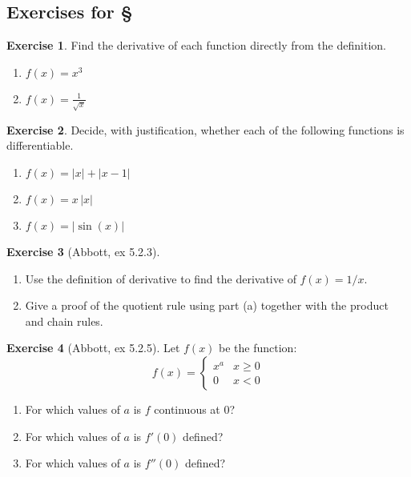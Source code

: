 \documentclass[11pt,oneside]{amsbook}
\theoremstyle{definition}
\newtheorem{exerc}{Exercise}[section]
\theoremstyle{plain}
\theoremstyle{definition}
\theoremstyle{remark}
\numberwithin{equation}{section}
\numberwithin{figure}{section}
\begin{document}

\newpage
\subsection*{Exercises for \S \thesection}

\begin{exerc}
  Find the derivative of each function directly from the definition.
  \begin{enumerate}
    \item $\displaystyle f(x)=x^3$
    \item $\displaystyle f(x)=\frac{1}{\sqrt{x}}$
  \end{enumerate}
\end{exerc}

\begin{exerc}
  Decide, with justification, whether each of the following functions is differentiable.
  \begin{enumerate}
    \item $\displaystyle f(x)=|x|+|x-1|$
    \item $\displaystyle f(x)=x\,|x|$
    \item $\displaystyle f(x)=|\sin(x)|$
  \end{enumerate}
\end{exerc}
  
\begin{exerc}[Abbott, ex 5.2.3]
  \begin{enumerate}
    \item Use the definition of derivative to find the derivative of $f(x)=1/x$.
    \item Give a proof of the quotient rule using part (a) together with the product and chain rules.
  \end{enumerate}
\end{exerc}

\begin{exerc}[Abbott, ex 5.2.5]
  Let $f(x)$ be the function:
  \[f(x)=\begin{cases}x^a&x\geq0\\0&x<0\end{cases}\]
  \begin{enumerate}
    \item For which values of $a$ is $f$ continuous at $0$?
    \item For which values of $a$ is $f'(0)$ defined?
    \item For which values of $a$ is $f''(0)$ defined?
  \end{enumerate}
\end{exerc}
\end{document}
